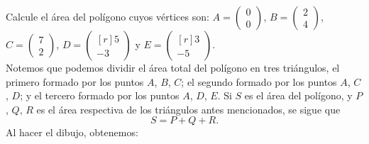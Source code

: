 \begin{example}
    Calcule el área del polígono cuyos vértices son: $A = \begin{pmatrix}
        0 \\
        0
    \end{pmatrix}$, $B = \begin{pmatrix}
        2 \\
        4
    \end{pmatrix}$, $C = \begin{pmatrix}
        7 \\
        2
    \end{pmatrix}$, $D = \begin{pmatrix*}[r]
        5 \\
        -3
    \end{pmatrix*}$ y $E = \begin{pmatrix*}[r]
        3 \\
        -5
    \end{pmatrix*}$. \\
    \solucion Notemos que podemos dividir el área total del polígono en tres triángulos, el primero formado por los puntos $A$, $B$, $C$; el segundo formado por los puntos $A$, $C$, $D$; y el tercero formado por los puntos $A$, $D$, $E$. Si $S$ es el área del polígono, y $P$, $Q$, $R$ es el área respectiva de los triángulos antes mencionados, se sigue que
    $$S = P + Q + R.$$
    Al hacer el dibujo, obtenemos:\newpage
    \begin{figure}[h!]
        \centering
\end{figure}
\end{example}
